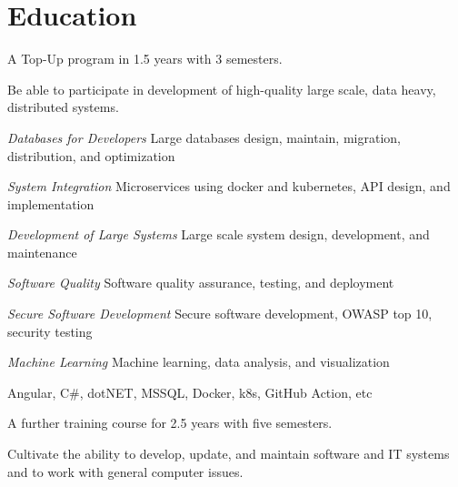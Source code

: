 \section{Education}
\begin{resume_list}
\item A Top-Up program in 1.5 years with 3 semesters. 
\item Be able to participate in development of high-quality large scale, data heavy, distributed systems.
\end{resume_list}

\begin{resume_list}
	\item {\it Databases for Developers} {\hfill Large databases design, maintain, migration, distribution, and optimization}
	\item {\it System Integration} {\hfill Microservices using docker and kubernetes, API design, and implementation}
	\item {\it Development of Large Systems} {\hfill Large scale system design, development, and maintenance}
	\item {\it Software Quality} {\hfill Software quality assurance, testing, and deployment}
	\item {\it Secure Software Development} {\hfill Secure software development, OWASP top 10, security testing}
	\item {\it Machine Learning} {\hfill Machine learning, data analysis, and visualization}
\end{resume_list}

\begin{resume_list}
\item {Angular, C\#, dotNET, MSSQL, Docker, k8s, GitHub Action, etc }{}
\end{resume_list}

\begin{resume_list}
\item A further training course for 2.5 years with five semesters. 
\item Cultivate the ability to develop, update, and maintain software and IT systems and to work with general computer issues.
\end{resume_list}

